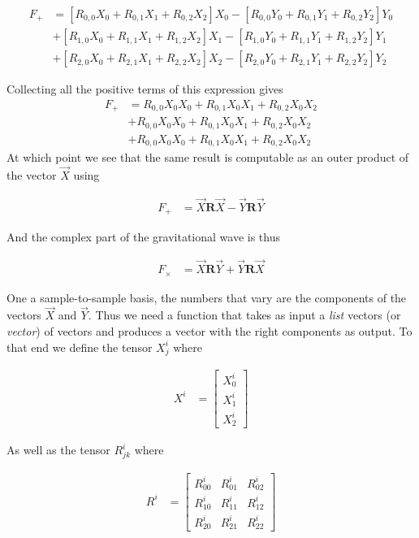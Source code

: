 \documentclass[paper=a4, fontsize=11pt]{scrartcl} %
\numberwithin{equation}{section} %
\numberwithin{figure}{section} %
\numberwithin{table}{section} %
\begin{document}
\begin{align}
F_{+} &= [R_{0,0}X_0 + R_{0,1}X_1 + R_{0,2}X_2]X_0 - [R_{0,0}Y_0 + R_{0,1}Y_1 + R_{0,2}Y_2]Y_0 \\
&+ [R_{1,0}X_0 + R_{1,1}X_1 + R_{1,2}X_2]X_1 - [R_{1,0}Y_0 + R_{1,1}Y_1 + R_{1,2}Y_2]Y_1 \\
&+ [R_{2,0}X_0 + R_{2,1}X_1 + R_{2,2}X_2]X_2 - [R_{2,0}Y_0 + R_{2,1}Y_1 + R_{2,2}Y_2]Y_2
\end{align}

Collecting all the positive terms of this expression gives
\begin{align}
F_{+} &= R_{0,0}X_0X_0 + R_{0,1}X_0X_1 + R_{0,2}X_0X_2 \\
&+ R_{0,0}X_0X_0 + R_{0,1}X_0X_1 + R_{0,2}X_0X_2 \\ 
&+ R_{0,0}X_0X_0 + R_{0,1}X_0X_1 + R_{0,2}X_0X_2 
\end{align}
At which point we see that the same result is computable as an outer product of the vector $\vec{X}$ using

\begin{align}
F_{+} &= \vec{X}\mathbf{R}\vec{X} - \vec{Y}\mathbf{R}\vec{Y}
\end{align}

And the complex part of the gravitational wave is thus

\begin{align}
F_{\times} &= \vec{X}\mathbf{R}\vec{Y} + \vec{Y}\mathbf{R}\vec{X}
\end{align}

One a sample-to-sample basis, the numbers that vary are the components of the vectors $\vec{X}$ and $\vec{Y}$. Thus we need a function that takes as input a \textit{list} vectors (or \textit{vector}) of vectors and produces a vector with the right components as output. To that end we define the tensor $X^{i}_{j}$ where

\begin{align}
X^i &= 
\begin{bmatrix}
X^{i}_0 \\
X^{i}_1 \\
X^{i}_2
\end{bmatrix}
\end{align}

As well as the tensor $R^{i}_{jk}$ where

\begin{align}
R^{i} &= 
\begin{bmatrix}
R^{i}_{00} & R^{i}_{01} & R^{i}_{02} \\ 
R^{i}_{10} & R^{i}_{11} & R^{i}_{12} \\ 
R^{i}_{20} & R^{i}_{21} & R^{i}_{22}  
\end{bmatrix}
\end{align}
\end{document}
